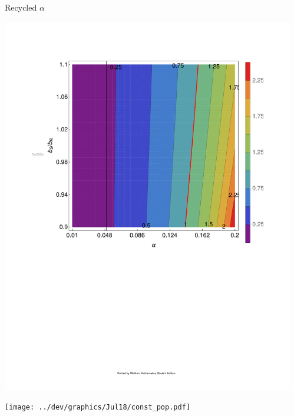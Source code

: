 \documentclass[final]{beamer}
\newlength{\sepwid}
\newlength{\onecolwid}
\begin{document}
\begin{frame}[t]
\begin{columns}[t]
\begin{column}{\onecolwid}
\begin{alertblock}{Recycled $\alpha$}
      \begin{center}
        \includegraphics[width=0.9\columnwidth]{../dev/graphics/Jul14/const_alpha_contour.pdf}

        \texttt{[image: ../dev/graphics/Jul18/const\_pop.pdf]}
      \end{center}


      \end{alertblock}
\end{column}
\begin{column}{\sepwid}\end{column} %





\end{columns} %
\end{frame} %
\end{document}

